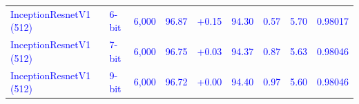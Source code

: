 \begin{tabular}{@{}llrrrrrrr@{}}
\textcolor{blue}{InceptionResnetV1 (512)} & \textcolor{blue}{6-bit} & \textcolor{blue}{6{,}000} & \textcolor{blue}{96.87} & \textcolor{blue}{+0.15} & \textcolor{blue}{94.30} & \textcolor{blue}{0.57} & \textcolor{blue}{5.70} & \textcolor{blue}{0.98017} \\
\textcolor{blue}{InceptionResnetV1 (512)} & \textcolor{blue}{7-bit} & \textcolor{blue}{6{,}000} & \textcolor{blue}{96.75} & \textcolor{blue}{+0.03} & \textcolor{blue}{94.37} & \textcolor{blue}{0.87} & \textcolor{blue}{5.63} & \textcolor{blue}{0.98046} \\
\textcolor{blue}{InceptionResnetV1 (512)} & \textcolor{blue}{9-bit} & \textcolor{blue}{6{,}000} & \textcolor{blue}{96.72} & \textcolor{blue}{+0.00} & \textcolor{blue}{94.40} & \textcolor{blue}{0.97} & \textcolor{blue}{5.60} & \textcolor{blue}{0.98046} \\
\bottomrule
\end{tabular}
